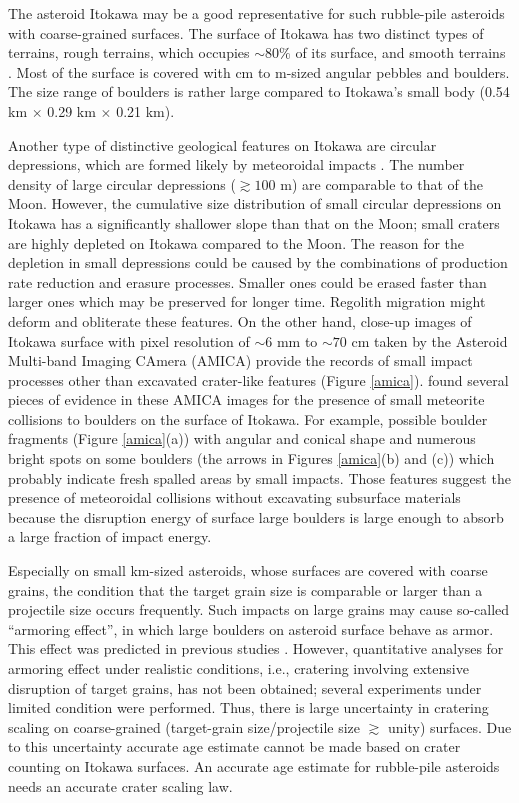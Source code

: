 \documentclass[3p,authoryear]{elsarticle}
\begin{document}
The asteroid Itokawa may be a good representative for such rubble-pile asteroids with coarse-grained surfaces.
The surface of Itokawa has two distinct types of terrains, rough terrains, which occupies $\sim 80\%$ of its surface, and smooth terrains \citep{saito2006}.
Most of the surface is covered with cm to m-sized angular pebbles and boulders. The size range of boulders is rather large compared to Itokawa's small body (0.54 km $\times$ 0.29 km $\times$ 0.21 km).

Another type of distinctive geological features on Itokawa are circular depressions, which are formed likely by meteoroidal impacts \citep{hirata2009}.
The number density of large circular depressions ($\gtrsim 100$ m) are comparable to that of the Moon.
However, the cumulative size distribution of small circular depressions on Itokawa has a significantly shallower slope than that on the Moon;
small craters are highly depleted on Itokawa compared to the Moon.
The reason for the depletion in small depressions could be caused by the combinations of production rate reduction and erasure processes.
Smaller ones could be erased faster than larger ones which may be preserved for longer time. Regolith migration \citep{miyamoto2007, tancredi2015} might deform and obliterate these features.
On the other hand, close-up images of Itokawa surface with pixel resolution of $\sim 6$ mm to $\sim70$ cm taken by the Asteroid Multi-band Imaging CAmera (AMICA) provide the records of small impact processes other than excavated crater-like features (Figure \ref{amica}). \citet{nakamura2008} found several pieces of evidence in these AMICA images for the presence of small meteorite collisions to boulders on the surface of Itokawa.
For example, possible boulder fragments (Figure \ref{amica}(a)) with angular and conical shape and numerous bright spots on some boulders (the arrows in Figures \ref{amica}(b) and (c)) which probably indicate fresh spalled areas by small impacts.
Those features suggest the presence of meteoroidal collisions without excavating subsurface materials because the disruption energy of surface large boulders is large enough to absorb a large fraction of impact energy.

Especially on small km-sized asteroids, whose surfaces are covered with coarse grains, the condition that the target grain size is comparable or larger than a projectile size occurs frequently. Such impacts on large grains may cause so-called ``armoring effect'', in which large boulders on asteroid surface behave as armor.
This effect was predicted in previous studies \citep[e.g.,][]{barnouin2005, guettler2012}.
However, quantitative analyses for armoring effect under realistic conditions, i.e., cratering involving extensive disruption of target grains, has not been obtained; several experiments under limited condition were performed.
Thus, there is large uncertainty in cratering scaling on coarse-grained (target-grain size/projectile size $\gtrsim $ unity) surfaces. Due to this uncertainty accurate age estimate cannot be made based on crater counting on Itokawa surfaces. An accurate age estimate for rubble-pile asteroids needs an accurate crater scaling law.
\end{document}
